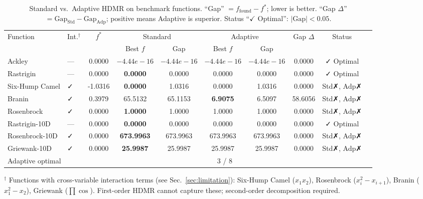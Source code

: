 
\begin{table}[htbp]
\centering
\small
\caption{Standard vs.\ Adaptive HDMR on benchmark functions. ``Gap'' $= f_{\mathrm{found}} - f^{*}$; lower is better. ``Gap $\Delta$'' $= \mathrm{Gap}_{\mathrm{Std}} - \mathrm{Gap}_{\mathrm{Adp}}$; positive means Adaptive is superior. Status ``$\checkmark$ Optimal'': $|\mathrm{Gap}| < 0.05$.}
\label{tab:benchmark}
\begin{tabular}{llcccccccc}
\toprule
Function & Int.\footnotesize{$^{\dagger}$} & $f^{*}$ & \multicolumn{2}{c}{Standard} & \multicolumn{2}{c}{Adaptive} & Gap $\Delta$ & Status \\
\cmidrule(lr){4-5} \cmidrule(lr){6-7}
 &  & & Best $f$ & Gap & Best $f$ & Gap &  & \\
\midrule
Ackley & — & 0.0000 & \textbf{$-4.44e-16$} & $-4.44e-16$ & $-4.44e-16$ & $-4.44e-16$ & 0.0000 & ✓ Optimal \\
Rastrigin & — & 0.0000 & \textbf{0.0000} & 0.0000 & 0.0000 & 0.0000 & 0.0000 & ✓ Optimal \\
Six-Hump Camel & ✓ & -1.0316 & \textbf{0.0000} & 1.0316 & 0.0000 & 1.0316 & 0.0000 & Std✗, Adp✗ \\
Branin & ✓ & 0.3979 & 65.5132 & 65.1153 & \textbf{6.9075} & 6.5097 & 58.6056 & Std✗, Adp✗ \\
Rosenbrock & ✓ & 0.0000 & \textbf{1.0000} & 1.0000 & 1.0000 & 1.0000 & 0.0000 & Std✗, Adp✗ \\
Rastrigin-10D & — & 0.0000 & \textbf{0.0000} & 0.0000 & 0.0000 & 0.0000 & 0.0000 & ✓ Optimal \\
Rosenbrock-10D & ✓ & 0.0000 & \textbf{673.9963} & 673.9963 & 673.9963 & 673.9963 & 0.0000 & Std✗, Adp✗ \\
Griewank-10D & ✓ & 0.0000 & \textbf{25.9987} & 25.9987 & 25.9987 & 25.9987 & 0.0000 & Std✗, Adp✗ \\
\midrule
\multicolumn{2}{l}{Adaptive optimal} & \multicolumn{7}{c}{3 / 8} \\
\bottomrule
\end{tabular}
\footnotesize$^{\dagger}$ Functions with cross-variable interaction terms (see Sec.~\ref{sec:limitation}): Six-Hump Camel ($x_1 x_2$), Rosenbrock ($x_i^2 - x_{i+1}$), Branin ($x_1^2 - x_2$), Griewank ($\prod\cos$). First-order HDMR cannot capture these; second-order decomposition required.
\end{table}

